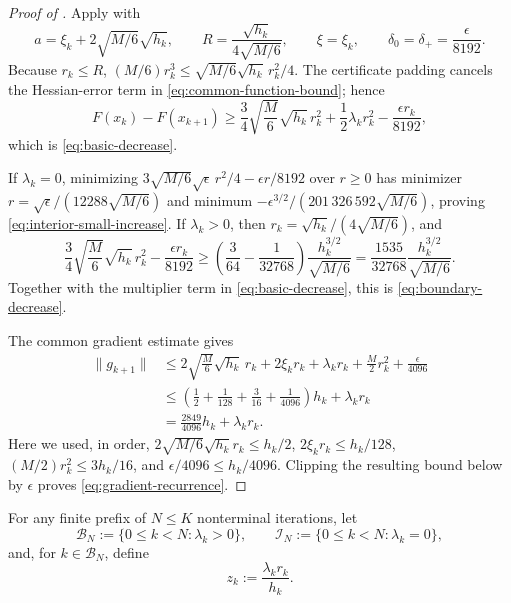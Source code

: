 \documentclass{article}
\begin{document}
\begin{proof}[Proof of ]
Apply  with
\[
 a=\xi_k+2\sqrt{M/6}\sqrt{h_k},\qquad
 R=\frac{\sqrt{h_k}}{4\sqrt{M/6}},\qquad
 \xi=\xi_k,\qquad
 \delta_0=\delta_+=\frac{\epsilon}{8192}.
\]
Because $r_k\le R$,
$(M/6)r_k^3\le\sqrt{M/6}\sqrt{h_k}\,r_k^2/4$.
The certificate padding cancels the Hessian-error term in
\eqref{eq:common-function-bound}; hence
\[
 F(x_k)-F(x_{k+1})
 \ge\frac34\sqrt{\frac M6}\sqrt{h_k}\,r_k^2
  +\frac12\lambda_kr_k^2-\frac{\epsilon r_k}{8192},
\]
which is \eqref{eq:basic-decrease}.

If $\lambda_k=0$, minimizing
$3\sqrt{M/6}\sqrt\epsilon\,r^2/4-\epsilon r/8192$ over $r\ge0$
has minimizer $r=\sqrt\epsilon/(12288\sqrt{M/6})$ and minimum
$-\epsilon^{3/2}/(201\,326\,592\sqrt{M/6})$, proving
\eqref{eq:interior-small-increase}.  If $\lambda_k>0$, then
$r_k=\sqrt{h_k}/(4\sqrt{M/6})$, and
\[
  \frac34\sqrt{\frac M6}\sqrt{h_k}\,r_k^2
  -\frac{\epsilon r_k}{8192}
  \ge\left(\frac3{64}-\frac1{32768}\right)
      \frac{h_k^{3/2}}{\sqrt{M/6}}
  =\frac{1535}{32768}\frac{h_k^{3/2}}{\sqrt{M/6}}.
\]
Together with the multiplier term in \eqref{eq:basic-decrease}, this
is \eqref{eq:boundary-decrease}.

The common gradient estimate gives
\begin{align*}
\|g_{k+1}\|
&\le2\sqrt{\frac M6}\sqrt{h_k}\,r_k+2\xi_kr_k
  +\lambda_kr_k+\frac M2r_k^2+\frac{\epsilon}{4096}\\
&\le\left(\frac12+\frac1{128}+\frac3{16}
  +\frac1{4096}\right)h_k+\lambda_kr_k\\
&=\frac{2849}{4096}h_k+\lambda_kr_k.
\end{align*}
Here we used, in order,
$2\sqrt{M/6}\sqrt{h_k}r_k\le h_k/2$,
$2\xi_kr_k\le h_k/128$,
$(M/2)r_k^2\le3h_k/16$,
and $\epsilon/4096\le h_k/4096$.
Clipping the resulting bound below by $\epsilon$ proves
\eqref{eq:gradient-recurrence}.
\end{proof}

For any finite prefix of $N\le K$ nonterminal iterations, let
\[
 \mathcal B_N:=\{0\le k<N:\lambda_k>0\},
 \qquad
 \mathcal I_N:=\{0\le k<N:\lambda_k=0\},
\]
and, for $k\in\mathcal B_N$, define
\begin{equation}\label{eq:z-definition}
 z_k:=\frac{\lambda_kr_k}{h_k}.
\end{equation}
\end{document}

